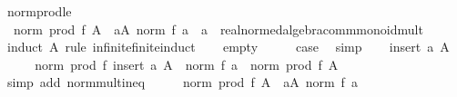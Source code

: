 \begin{isabellebody}
\endisatagproof
{\isafoldproof}%
%
\isadelimproof
\isanewline
%
\endisadelimproof
\isanewline
{}\isamarkupfalse%
\ norm{\isacharunderscore}{\kern0pt}prod{\isacharunderscore}{\kern0pt}le{\isacharcolon}{\kern0pt}\isanewline
\ \ {\isachardoublequoteopen}norm\ {\isacharparenleft}{\kern0pt}prod\ f\ A{\isacharparenright}{\kern0pt}\ {\isasymle}\ {\isacharparenleft}{\kern0pt}{\isasymProd}a{\isasymin}A{\isachardot}{\kern0pt}\ norm\ {\isacharparenleft}{\kern0pt}f\ a\ {\isacharcolon}{\kern0pt}{\isacharcolon}{\kern0pt}\ {\isacharprime}{\kern0pt}a\ {\isacharcolon}{\kern0pt}{\isacharcolon}{\kern0pt}\ {\isacharbraceleft}{\kern0pt}real{\isacharunderscore}{\kern0pt}normed{\isacharunderscore}{\kern0pt}algebra{\isacharunderscore}{\kern0pt}{}{\isacharcomma}{\kern0pt}comm{\isacharunderscore}{\kern0pt}monoid{\isacharunderscore}{\kern0pt}mult{\isacharbraceright}{\kern0pt}{\isacharparenright}{\kern0pt}{\isacharparenright}{\kern0pt}{\isachardoublequoteclose}\isanewline
%
\isadelimproof
%
\endisadelimproof
%
\isatagproof
{}\isamarkupfalse%
\ {\isacharparenleft}{\kern0pt}induct\ A\ rule{\isacharcolon}{\kern0pt}\ infinite{\isacharunderscore}{\kern0pt}finite{\isacharunderscore}{\kern0pt}induct{\isacharparenright}{\kern0pt}\isanewline
\ \ \isamarkupfalse%
\ empty\isanewline
\ \ \isamarkupfalse%
\ \isamarkupfalse%
\ {\isacharquery}{\kern0pt}case\ \isamarkupfalse%
\ simp\isanewline
{}\isamarkupfalse%
\isanewline
\ \ \isamarkupfalse%
\ {\isacharparenleft}{\kern0pt}insert\ a\ A{\isacharparenright}{\kern0pt}\isanewline
\ \ \isamarkupfalse%
\ \isamarkupfalse%
\ {\isachardoublequoteopen}norm\ {\isacharparenleft}{\kern0pt}prod\ f\ {\isacharparenleft}{\kern0pt}insert\ a\ A{\isacharparenright}{\kern0pt}{\isacharparenright}{\kern0pt}\ {\isasymle}\ norm\ {\isacharparenleft}{\kern0pt}f\ a{\isacharparenright}{\kern0pt}\ {\isacharasterisk}{\kern0pt}\ norm\ {\isacharparenleft}{\kern0pt}prod\ f\ A{\isacharparenright}{\kern0pt}{\isachardoublequoteclose}\isanewline
\ \ \ \ \isamarkupfalse%
\ {\isacharparenleft}{\kern0pt}simp\ add{\isacharcolon}{\kern0pt}\ norm{\isacharunderscore}{\kern0pt}mult{\isacharunderscore}{\kern0pt}ineq{\isacharparenright}{\kern0pt}\isanewline
\ \ \isamarkupfalse%
\ \isamarkupfalse%
\ {\isachardoublequoteopen}norm\ {\isacharparenleft}{\kern0pt}prod\ f\ A{\isacharparenright}{\kern0pt}\ {\isasymle}\ {\isacharparenleft}{\kern0pt}{\isasymProd}a{\isasymin}A{\isachardot}{\kern0pt}\ norm\ {\isacharparenleft}{\kern0pt}f\ a{\isacharparenright}{\kern0pt}{\isacharparenright}{\kern0pt}{\isachardoublequoteclose}\isanewline

\end{isabellebody}
